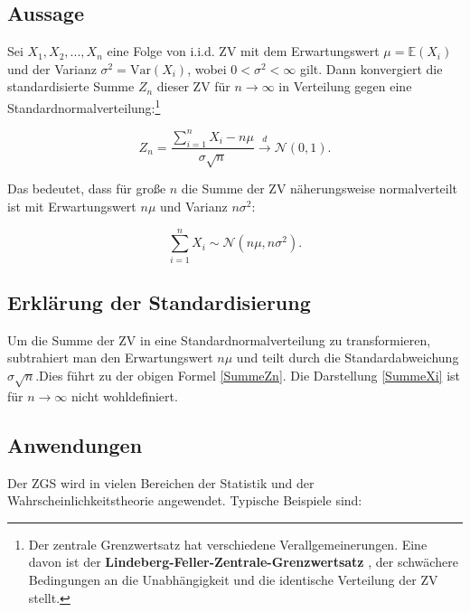 \documentclass[a4paper, 12pt]{article}
\begin{document}
\subsection{Aussage}
Sei \( X_1, X_2,..., X_n \) eine Folge von i.i.d. ZV mit dem Erwartungswert \( \mu = \mathbb{E}(X_i) \) und der Varianz \( \sigma^2 = \mathrm{Var}(X_i) \), wobei \( 0 < \sigma^2 < \infty \) gilt. Dann konvergiert die standardisierte Summe \( Z_n \) dieser ZV für \( n \to \infty \) in Verteilung gegen eine Standardnormalverteilung:\footnote{Der zentrale Grenzwertsatz hat verschiedene Verallgemeinerungen. Eine davon ist der
\textbf{Lindeberg-Feller-Zentrale-Grenzwertsatz} 
\cite[Seite 328]{1}, der schwächere Bedingungen an die Unabhängigkeit und die identische Verteilung der ZV stellt.}

\begin{equation}
    Z_n = \frac{\sum_{i=1}^n X_i - n\mu}{\sigma\sqrt{n}} \xrightarrow{d} \mathcal{N}(0, 1). \label{SummeZn}
\end{equation}

Das bedeutet, dass für große \( n \) die Summe der ZV näherungsweise normalverteilt ist mit Erwartungswert \(n \mu\) und Varianz \(n \sigma^2\):

\begin{equation}
    \sum_{i=1}^n X_i \sim \mathcal{N}(n\mu, n\sigma^2).\label{SummeXi}
\end{equation}

\subsection{Erklärung der Standardisierung}
Um die Summe der ZV in eine Standardnormalverteilung zu transformieren, subtrahiert man den Erwartungswert \( n\mu \) und teilt durch die Standardabweichung \( \sigma\sqrt{n} \).Dies führt zu der obigen Formel \eqref{SummeZn}. Die Darstellung \eqref{SummeXi} ist für \(n \rightarrow \infty\)
nicht wohldefiniert.

\newpage

\subsection{Anwendungen}
Der ZGS wird in vielen Bereichen der Statistik und der Wahrscheinlichkeitstheorie angewendet. Typische Beispiele sind:
\end{document}
